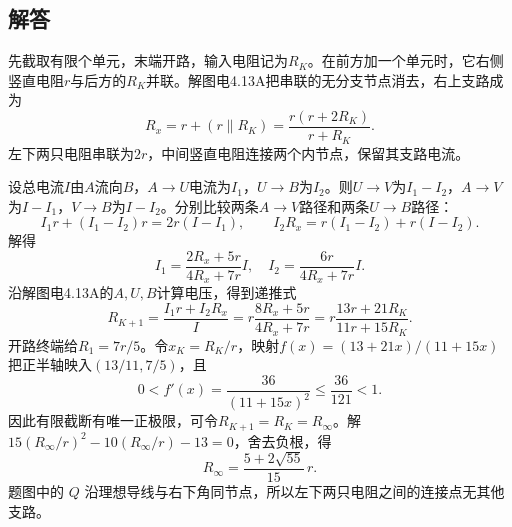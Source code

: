 \documentclass[UTF8,fontset=fandol,a4paper,11pt]{ctexart}
\newcommand{\figcaption}[1]{\par\vspace{2pt}{\small\color{muted}#1}\par}
\begin{document}
\subsection*{解答}

先截取有限个单元，末端开路，输入电阻记为$R_K$。在前方加一个单元时，它右侧竖直电阻$r$与后方的$R_K$并联。解图电4.13A把串联的无分支节点消去，右上支路成为
\[
R_x=r+(r\parallel R_K)=\frac{r(r+2R_K)}{r+R_K}.
\]
左下两只电阻串联为$2r$，中间竖直电阻连接两个内节点，保留其支路电流。

\begin{center}\begin{minipage}{.98\linewidth}\centering
{}
\figcaption{解图电4.13A\quad 先保留桥臂，再替换尾网}
\end{minipage}\end{center}

设总电流$I$由$A$流向$B$，$A\to U$电流为$I_1$，$U\to B$为$I_2$。则$U\to V$为$I_1-I_2$，$A\to V$为$I-I_1$，$V\to B$为$I-I_2$。分别比较两条$A\to V$路径和两条$U\to B$路径：
\[
I_1r+(I_1-I_2)r=2r(I-I_1),\qquad
I_2R_x=r(I_1-I_2)+r(I-I_2).
\]
解得
\[
I_1=\frac{2R_x+5r}{4R_x+7r}I,\quad
I_2=\frac{6r}{4R_x+7r}I.
\]
沿解图电4.13A的$A,U,B$计算电压，得到递推式
\[
R_{K+1}=\frac{I_1r+I_2R_x}{I}
=r\frac{8R_x+5r}{4R_x+7r}
=r\frac{13r+21R_K}{11r+15R_K}.
\]
开路终端给$R_1=7r/5$。令$x_K=R_K/r$，映射$f(x)=(13+21x)/(11+15x)$把正半轴映入$(13/11,7/5)$，且
\[
0<f'(x)=\frac{36}{(11+15x)^2}\le\frac{36}{121}<1.
\]
因此有限截断有唯一正极限，可令$R_{K+1}=R_K=R_\infty$。解
$15(R_\infty/r)^2-10(R_\infty/r)-13=0$，舍去负根，得
\[
\boxed{R_\infty=\frac{5+2\sqrt{55}}{15}\,r}.
\]
题图中的 $Q$ 沿理想导线与右下角同节点，所以左下两只电阻之间的连接点无其他支路。
\end{document}
